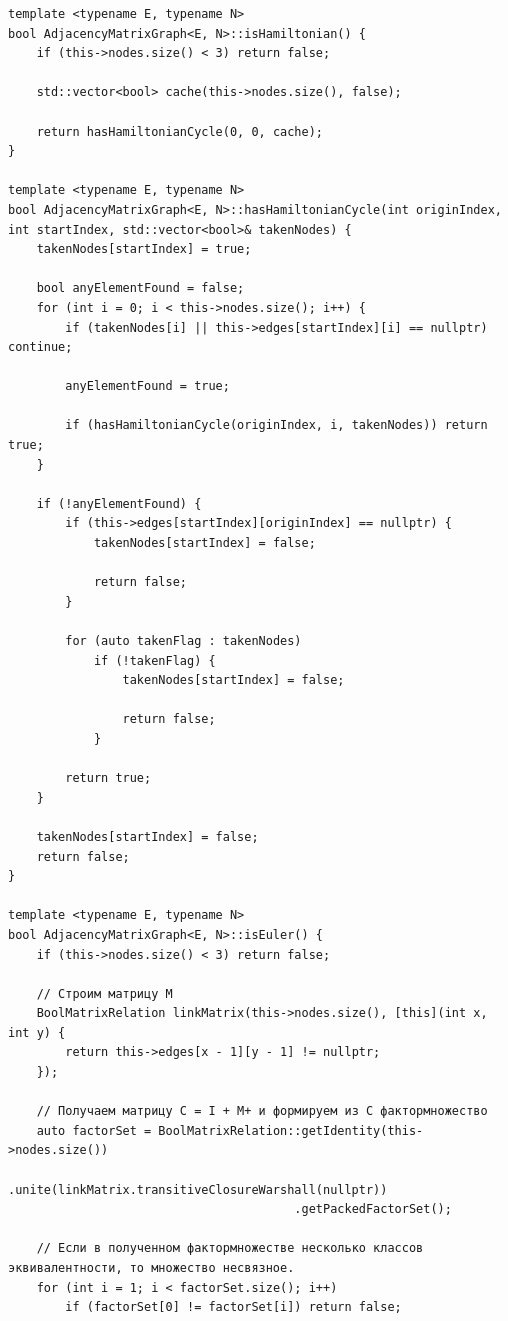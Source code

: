 \documentclass[a4paper,14pt]{extarticle}
\begin{document}
\begin{enumerate}[1.]
\begin{verbatim}
template <typename E, typename N>
bool AdjacencyMatrixGraph<E, N>::isHamiltonian() {
    if (this->nodes.size() < 3) return false;

    std::vector<bool> cache(this->nodes.size(), false);

    return hasHamiltonianCycle(0, 0, cache);
}

template <typename E, typename N>
bool AdjacencyMatrixGraph<E, N>::hasHamiltonianCycle(int originIndex, int startIndex, std::vector<bool>& takenNodes) {
    takenNodes[startIndex] = true;

    bool anyElementFound = false;
    for (int i = 0; i < this->nodes.size(); i++) {
        if (takenNodes[i] || this->edges[startIndex][i] == nullptr) continue;

        anyElementFound = true;
        
        if (hasHamiltonianCycle(originIndex, i, takenNodes)) return true;
    }

    if (!anyElementFound) {
        if (this->edges[startIndex][originIndex] == nullptr) {
            takenNodes[startIndex] = false;

            return false;
        }

        for (auto takenFlag : takenNodes) 
            if (!takenFlag) {
                takenNodes[startIndex] = false;

                return false;
            }

        return true;
    }

    takenNodes[startIndex] = false;
    return false;
}

template <typename E, typename N>
bool AdjacencyMatrixGraph<E, N>::isEuler() {
    if (this->nodes.size() < 3) return false;

    // Строим матрицу M 
    BoolMatrixRelation linkMatrix(this->nodes.size(), [this](int x, int y) {
        return this->edges[x - 1][y - 1] != nullptr;
    });

    // Получаем матрицу C = I + M+ и формируем из C фактормножество
    auto factorSet = BoolMatrixRelation::getIdentity(this->nodes.size())
                                        .unite(linkMatrix.transitiveClosureWarshall(nullptr))
                                        .getPackedFactorSet();
    
    // Если в полученном фактормножестве несколько классов эквивалентности, то множество несвязное.
    for (int i = 1; i < factorSet.size(); i++) 
        if (factorSet[0] != factorSet[i]) return false;


\end{verbatim}
\end{enumerate}
\end{document}
